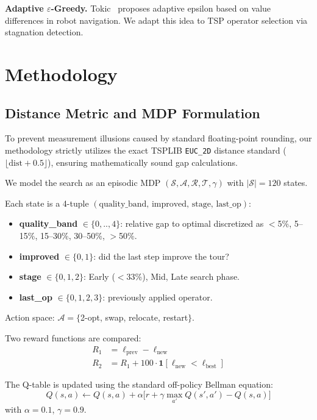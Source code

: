 \documentclass[10pt,twocolumn]{article}
\begin{document}
\textbf{Adaptive $\varepsilon$-Greedy.}
Tokic~\cite{tokic10} proposes adaptive epsilon based on value differences in
robot navigation. We adapt this idea to TSP operator selection via
stagnation detection.

\section{Methodology}

\subsection{Distance Metric and MDP Formulation}

To prevent measurement illusions caused by standard floating-point rounding, our 
methodology strictly utilizes the exact TSPLIB \texttt{EUC\_2D} distance standard 
($\lfloor \text{dist} + 0.5 \rfloor$), ensuring mathematically sound gap calculations.

We model the search as an episodic MDP $(\mathcal{S}, \mathcal{A}, \mathcal{R},
\mathcal{T}, \gamma)$ with $|\mathcal{S}|=120$ states.

Each state is a 4-tuple $(\text{quality\_band},\, \text{improved},\,
\text{stage},\, \text{last\_op})$:
\begin{itemize}\itemsep0pt
  \item \textbf{quality\_band} $\in\{0,..,4\}$: relative gap to optimal
        discretized as $<$5\%, 5--15\%, 15--30\%, 30--50\%, $>$50\%.
  \item \textbf{improved} $\in\{0,1\}$: did the last step improve the tour?
  \item \textbf{stage} $\in\{0,1,2\}$: Early ($<$33\%), Mid, Late search phase.
  \item \textbf{last\_op} $\in\{0,1,2,3\}$: previously applied operator.
\end{itemize}

Action space: $\mathcal{A}=\{$2-opt, swap, relocate, restart$\}$.

Two reward functions are compared:
\begin{align}
  R_1 &= \ell_{\text{prev}} - \ell_{\text{new}} \\
  R_2 &= R_1 + 100\cdot\mathbf{1}[\ell_{\text{new}} < \ell_{\text{best}}]
\end{align}

The Q-table is updated using the standard off-policy Bellman equation:
\begin{equation}
Q(s,a) \leftarrow Q(s,a) + \alpha\bigl[r + \gamma\max_{a'}Q(s',a') - Q(s,a)\bigr]
\end{equation}
with $\alpha=0.1$, $\gamma=0.9$.
\end{document}
